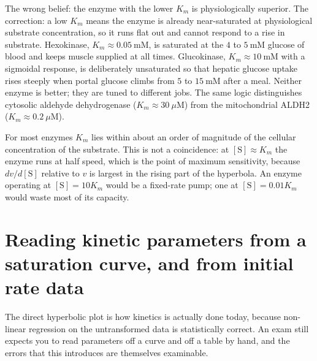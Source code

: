 \begin{warnbox}[title={TRAP: low $K_m$ equals better enzyme}]
The wrong belief: the enzyme with the lower $K_m$ is physiologically superior. The
correction: a low $K_m$ means the enzyme is already near-saturated at physiological
substrate concentration, so it runs flat out and cannot respond to a rise in
substrate. Hexokinase, $K_m\approx 0.05\ \mathrm{mM}$, is saturated at the
$4$ to $5\ \mathrm{mM}$ glucose of blood and keeps muscle supplied at all times.
Glucokinase, $K_m\approx 10\ \mathrm{mM}$ with a sigmoidal response, is deliberately
unsaturated so that hepatic glucose uptake rises steeply when portal glucose climbs
from $5$ to $15\ \mathrm{mM}$ after a meal. Neither enzyme is better; they are tuned
to different jobs. The same logic distinguishes cytosolic
aldehyde dehydrogenase ($K_m\approx 30\ \mu\mathrm{M}$) from the mitochondrial ALDH2
($K_m\approx 0.2\ \mu\mathrm{M}$).
\end{warnbox}

\begin{obsbox}[title={WORTH NOTICING: $K_m$ usually sits near physiological $[\mathrm{S}]$}]
For most enzymes $K_m$ lies within about an order of magnitude of the cellular
concentration of the substrate. This is not a coincidence: at $[\mathrm{S}]\approx K_m$
the enzyme runs at half speed, which is the point of maximum sensitivity, because
$dv/d[\mathrm{S}]$ relative to $v$ is largest in the rising part of the hyperbola.
An enzyme operating at $[\mathrm{S}]=10K_m$ would be a fixed-rate pump; one at
$[\mathrm{S}]=0.01K_m$ would waste most of its capacity.
\end{obsbox}

\section{Reading kinetic parameters from a saturation curve, and from initial rate data}

The direct hyperbolic plot is how kinetics is actually done today, because non-linear
regression on the untransformed data is statistically correct. An exam still expects you
to read parameters off a curve and off a table by hand, and the errors that this
introduces are themselves examinable.


